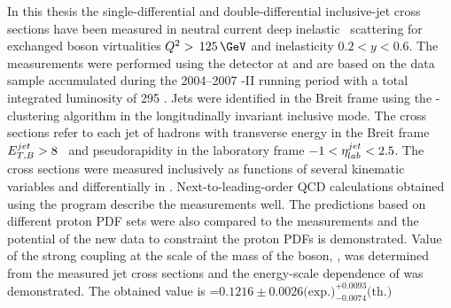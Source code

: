 In this thesis the single-differential and double-differential inclusive-jet cross sections have been measured in neutral current deep inelastic \ep\, scattering for exchanged boson virtualities $\qsq>\,125\,\GeV$ and inelasticity $0.2<y<0.6$. The measurements were performed using the \zeus detector at \hera and are based on the data sample accumulated during the 2004--2007 \hera-II running period with a total integrated luminosity of 295 \invpb. Jets were identified in the Breit frame using the \kt-clustering algorithm in the longitudinally invariant inclusive mode. The cross sections refer to each jet of hadrons with transverse energy in the Breit frame $\mbox{$E_{T,B}^{jet}$} > 8$ \GeV\, and pseudorapidity in the laboratory frame $-1<\mbox{$\eta^{jet}_{lab}$}<2.5$. The cross sections were measured inclusively as functions of several kinematic variables and differentially in \qsq. Next-to-leading-order QCD calculations obtained using the \nlojet program describe the measurements well. The predictions based on different proton PDF sets were also compared to the measurements and the potential of the new data to constraint the proton PDFs is demonstrated. Value of the strong coupling at the scale of the mass of the \zn boson, \asz, was determined from the measured jet cross sections and the energy-scale dependence of \as was demonstrated. The obtained value is \asz=$0.1216\pm 0.0026\text{(exp.)}^{+0.0093}_{-0.0074}\text{(th.)}$